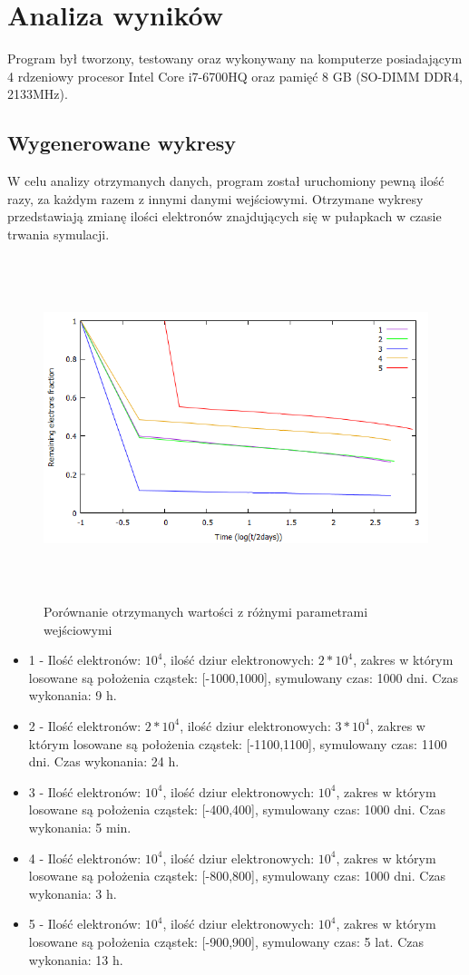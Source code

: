 \chapter{Analiza wyników}
Program był tworzony, testowany oraz wykonywany na komputerze posiadającym 4 rdzeniowy procesor Intel Core i7-6700HQ oraz pamięć 8 GB (SO-DIMM DDR4, 2133MHz).

\section{Wygenerowane wykresy}
\label{wynik:wykres}
W celu analizy otrzymanych danych, program został uruchomiony pewną ilość razy, za każdym razem z innymi danymi wejściowymi. Otrzymane wykresy przedstawiają zmianę ilości elektronów znajdujących się w pułapkach w czasie trwania symulacji.

\begin{figure}[H]
\centering
\includegraphics[width=17cm, height = 10cm]{wykres_all}
\caption{Porównanie otrzymanych wartości z różnymi parametrami wejściowymi}
\label{rys:1}
\end{figure}
\begin{itemize}
\item 1 - Ilość elektronów: $10^{4}$, ilość dziur elektronowych: $2*10^{4}$, zakres w którym losowane są położenia cząstek: [-1000,1000], symulowany czas: 1000 dni. Czas wykonania: 9 h.
\item 2 - Ilość elektronów: $2*10^{4}$, ilość dziur elektronowych: $3*10^{4}$, zakres w którym losowane są położenia cząstek: [-1100,1100], symulowany czas: 1100 dni. Czas wykonania: 24 h.
\item 3 - Ilość elektronów: $10^{4}$, ilość dziur elektronowych: $10^{4}$, zakres w którym losowane są położenia cząstek: [-400,400], symulowany czas: 1000 dni. Czas wykonania: 5 min.
\label{wykres:1}
\item 4 - Ilość elektronów: $10^{4}$, ilość dziur elektronowych: $10^{4}$, zakres w którym losowane są położenia cząstek: [-800,800], symulowany czas: 1000 dni. Czas wykonania: 3 h.
\label{wykres:2}
\item 5 - Ilość elektronów: $10^{4}$, ilość dziur elektronowych: $10^{4}$, zakres w którym losowane są położenia cząstek: [-900,900], symulowany czas: 5 lat. Czas wykonania: 13 h.
\end{itemize}


